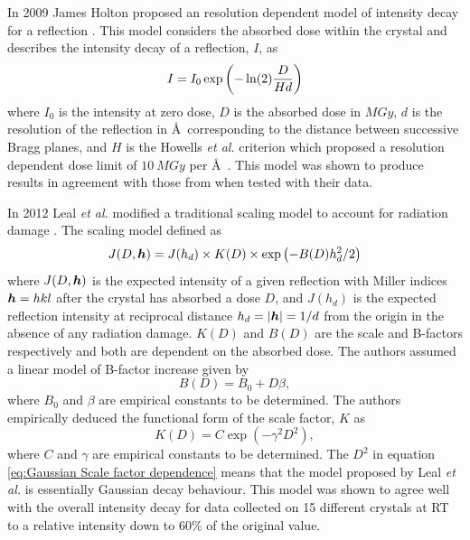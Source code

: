         In 2009 James Holton proposed an resolution dependent model of intensity decay for a reflection \cite{holton2009}. This model considers the absorbed dose within the crystal and describes the intensity decay of a reflection, $I$, as
        \begin{equation}
            I = I_0 \exp \left(-\ln(2)\frac{D}{Hd}\right)
        \end{equation}
        where $I_0$ is the intensity at zero dose, $D$ is the absorbed dose in $MGy$, $d$ is the resolution of the reflection in \AA\ corresponding to the distance between successive Bragg planes, and $H$ is the Howells \textit{et al.} criterion which proposed a resolution dependent dose limit of $10\ MGy$ per \AA\ \cite{howells2009}.
		This model was shown to produce results in agreement with those from \cite{owen2006,kmetko2006} when tested with their data.

        In 2012 Leal \textit{et al.} modified a traditional scaling model to account for radiation damage \cite{leal2012}. The scaling model defined as
        \begin{equation}
            J(D,\boldsymbol{h}) = J(h_d) \times K(D) \times \exp\left( -B(D) h_d^2/2\right)
			\label{eq:Scaling Model Leal 2012}
        \end{equation}
        where $J(D,\boldsymbol{h})$ is the expected intensity of a given reflection with Miller indices $\boldsymbol{h} = hkl$ after the crystal has absorbed a dose $D$, and $J(h_d)$ is the expected reflection intensity at reciprocal distance $h_d = |\boldsymbol{h}| = 1/d$ from the origin in the absence of any radiation damage.
		$K(D)$ and $B(D)$ are the scale and B-factors respectively and both are dependent on the absorbed dose.
		The authors assumed a linear model of B-factor increase given by
		\begin{equation}
			B(D) = B_0 + D \beta,
            \label{eq:Linear B factor dependence}
		\end{equation}
		where $B_0$ and $\beta$ are empirical constants to be determined.
		The authors empirically deduced the functional form of the scale factor, $K$ as
		\begin{equation}
			K(D) = C \exp\left(-\gamma^2 D^2\right),
            \label{eq:Gaussian Scale factor dependence}
		\end{equation}
		where $C$ and $\gamma$ are empirical constants to be determined.
        The $D^2$ in equation \ref{eq:Gaussian Scale factor dependence} means that the model proposed by Leal \textit{et al.} is essentially Gaussian decay behaviour.
		This model was shown to agree well with the overall intensity decay for data collected on 15 different crystals at RT to a relative intensity down to 60\% of the original value.

